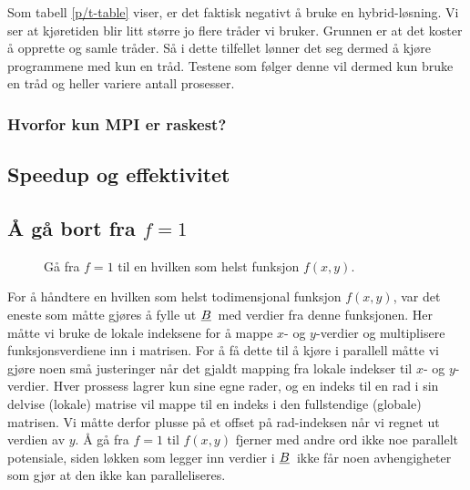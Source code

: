 \documentclass{article}
\newcommand{\ub}[1]{\underbar{$#1$}\,}
\begin{document}
Som tabell \ref{p/t-table} viser, er det faktisk negativt å bruke en hybrid-løsning. Vi ser at kjøretiden blir litt større jo flere tråder vi bruker. Grunnen er at det koster å opprette og samle tråder. Så i dette tilfellet lønner det seg dermed å kjøre programmene med kun en tråd. 
Testene som følger denne vil dermed kun bruke en tråd og heller variere antall prosesser. 

\subsubsection{Hvorfor kun MPI er raskest?}

\subsection{Speedup og effektivitet}
\subsection{Å gå bort fra $f=1$}
\begin{figure}[h]
	\centering
	
	\caption{Gå fra $f=1$ til en hvilken som helst funksjon $f(x, y)$.}
	\label{fig:local_f}
\end{figure}
For å håndtere en hvilken som helst todimensjonal funksjon $f(x, y)$, var det eneste som måtte gjøres å fylle ut $\ub{B}$ med verdier fra denne funksjonen. Her måtte vi bruke de lokale indeksene for å mappe $x$- og $y$-verdier og multiplisere funksjonsverdiene inn i matrisen. For å få dette til å kjøre i parallell måtte vi gjøre noen små justeringer når det gjaldt mapping fra lokale indekser til $x$- og $y$-verdier. Hver prossess lagrer kun sine egne rader, og en indeks til en rad i sin delvise (lokale) matrise vil mappe til en indeks i den fullstendige (globale) matrisen. Vi måtte derfor plusse på et offset på rad-indeksen når vi regnet ut verdien av $y$. Å gå fra $f=1$ til $f(x, y)$ fjerner med andre ord ikke noe parallelt potensiale, siden løkken som legger inn verdier i $\ub{B}$ ikke får noen avhengigheter som gjør at den ikke kan paralleliseres.
\end{document}
